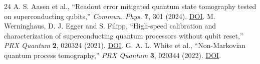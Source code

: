 \documentclass[11pt,letterpaper]{article}
\begin{document}
\begin{thebibliography}{24}
 A. S. Aasen et al., “Readout error mitigated quantum state tomography tested on superconducting qubits,” \textit{Commun. Phys.} \textbf{7}, 301 (2024). \href{https://doi.org/10.1038/s42005-024-01790-8}{DOI}.
 M. Werninghaus, D. J. Egger and S. Filipp, “High-speed calibration and characterization of superconducting quantum processors without qubit reset,” \textit{PRX Quantum} \textbf{2}, 020324 (2021). \href{https://doi.org/10.1103/PRXQuantum.2.020324}{DOI}.
 G. A. L. White et al., “Non-Markovian quantum process tomography,” \textit{PRX Quantum} \textbf{3}, 020344 (2022). \href{https://doi.org/10.1103/PRXQuantum.3.020344}{DOI}.
\end{thebibliography}
\end{document}
